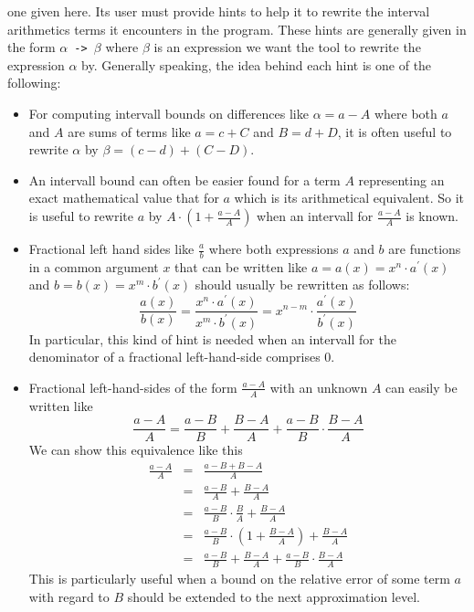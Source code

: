one given here. Its user must provide hints to help it to rewrite the interval arithmetics terms it encounters
in the program. These hints are generally given in the form {\tt $\alpha$ -> $\beta$} 
where $\beta$ is an expression we want the
tool to rewrite the expression $\alpha$ by. Generally speaking, the idea behind each hint is one of the following:
\begin{itemize}
\item For computing intervall bounds on differences like $\alpha = a - A$ where both $a$ and $A$ are sums of terms like 
$a = c + C$ and $B = d + D$, it is often useful to rewrite $\alpha$ by $\beta = \left(c - d \right) + \left( C - D \right)$.
\item An intervall bound can often be easier found for a term $A$ representing an exact mathematical value that for $a$
which is its arithmetical equivalent. So it is useful to rewrite $a$ by $A \cdot \left( 1 + \frac{a - A}{A} \right)$ when 
an intervall for $\frac{a - A}{A}$ is known. 
\item Fractional left hand sides like $\frac{a}{b}$ where both expressions $a$ and $b$ are functions in a common argument
$x$ that can be written like $a = a\left( x \right) = x^n \cdot a^\prime\left( x \right)$ and 
$b = b\left( x \right) = x^m \cdot b^\prime\left( x \right)$ should usually be rewritten as follows:
$$\frac{a\left(x\right)}{b\left( x \right)} = \frac{x^n \cdot a^\prime\left( x \right)}{x^m \cdot b^\prime\left( x \right)} = 
x^{n - m} \cdot \frac{a^\prime\left( x \right)}{b^\prime\left( x \right)}$$ In particular, this kind of hint is needed when an 
intervall for the denominator of a fractional left-hand-side comprises $0$.
\item Fractional left-hand-sides of the form $\frac{a - A}{A}$ with an unknown $A$ can easily be written like
$$\frac{a - A}{A} = \frac{a - B}{B} + \frac{B - A}{A} + \frac{a - B}{B} \cdot \frac{B - A}{A}$$
We can show this equivalence like this
\begin{eqnarray*}
\frac{a - A}{A} & = & \frac{a - B + B - A}{A} \\
& = & \frac{a - B}{A} + \frac{B - A}{A} \\
& = & \frac{a - B}{B} \cdot \frac{B}{A} + \frac{B - A}{A} \\
& = & \frac{a - B}{B} \cdot \left( 1 + \frac{B - A}{A} \right) + \frac{B - A}{A} \\
& = & \frac{a - B}{B} + \frac{B - A}{A} + \frac{a - B}{B} \cdot \frac{B - A}{A}
\end{eqnarray*}
This is particularly useful when a bound on the relative error of some term $a$ with regard to $B$ should be 
extended to the next approximation level. 
\end{itemize}
